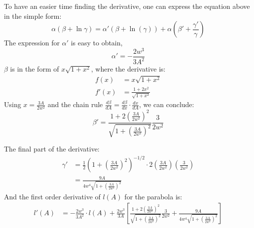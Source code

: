 \documentclass[12pt]{article}
\begin{document}
To have an easier time finding the derivative, one can express the equation above in the simple form:
\begin{equation}
    \alpha(\beta + \ln{\gamma}) = \alpha'(\beta + \ln(\gamma)) + \alpha\left(\beta' + \frac{\gamma'}{\gamma}\right)
\end{equation}
The expression for $\alpha'$ is easy to obtain,
\begin{equation}
    \alpha' = -\frac{2w^3}{3A^2}
\end{equation}
$\beta$ is in the form of $x\sqrt{1 + x^2}$, where the derivative is:
\begin{equation}
    \begin{split}
        f(x) &= x\sqrt{1 + x^2}
        \\
        f'(x) &= \frac{1 + 2x^2}{\sqrt{1 + x^2}}
    \end{split}
\end{equation}
Using $x = \frac{3A}{2w^2}$ and the chain rule $\frac{d\beta}{dA} = \frac{d\beta}{dx}\cdot\frac{dx}{dA}$, we can conclude:
\begin{equation}
    \beta' = \frac{1 + 2\left(\frac{3A}{2w^2}\right)^2}{\sqrt{1 + \left(\frac{3A}{2w^2}\right)^2}}\frac{3}{2w^2}
\end{equation}

The final part of the derivative:
\begin{equation}
    \begin{split}
        \gamma' &= \frac{1}{2}\left(1 + \left(\frac{3A}{2w^2}\right)^2\right)^{-1/2}\cdot2\left(\frac{3A}{2w^2}\right)\left(\frac{3}{2w^2}\right)
        \\&=\frac{9A}{4w^4\sqrt{1 + \left(\frac{3A}{2w^2}\right)^2}}
    \end{split}
\end{equation}
And the first order derivative of $l(A)$ for the parabola is:
\begin{equation}
    \begin{split}
        l'(A) &= -\frac{2w^3}{3A^2}\cdot l(A) +  \frac{2w^3}{3A}\left[\frac{1 + 2\left(\frac{3A}{2w^2}\right)^2}{\sqrt{1 + \left(\frac{3A}{2w^2}\right)^2}}\frac{3}{2w^2} +  \frac{9A}{4w^4\sqrt{1 + \left(\frac{3A}{2w^2}\right)^2}}\right]
    \end{split}
\end{equation}
\end{document}
